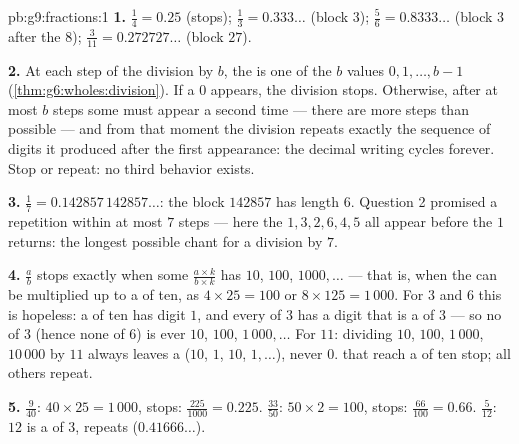 \begin{solution}{pb:g9:fractions:1}
\textbf{1.} $\frac14 = 0.25$ (stops); $\frac13 = 0.333\ldots$
(block $3$); $\frac56 = 0.8333\ldots$ (block $3$ after the
$8$); $\frac{3}{11} = 0.272727\ldots$ (block $27$).

\textbf{2.} At each step of the division by $b$, the 
is one of the $b$ values $0, 1, \dots, b - 1$
(\cref{thm:g6:wholes:division}). If a  $0$ appears, the
division stops. Otherwise, after at most $b$ steps some
 must appear a second time --- there are more steps
than possible  --- and from that moment the division
repeats exactly the sequence of digits it produced after the
first appearance: the decimal writing cycles forever. Stop or
repeat: no third behavior exists.

\textbf{3.} $\frac17 = 0.142857\,142857\ldots$: the block
$142857$ has length $6$. Question 2 promised a repetition within
at most $7$ steps --- here the 
$1, 3, 2, 6, 4, 5$ all appear before the $1$ returns: the
longest possible chant for a division by $7$.

\textbf{4.} $\frac ab$ stops exactly when some
$\frac{a \times k}{b \times k}$ has  $10$, $100$,
$1000, \dots$ --- that is, when the  can be
multiplied up to a  of ten, as $4 \times 25 = 100$ or
$8 \times 125 = 1\,000$. For $3$ and $6$ this is hopeless: a
 of ten has digit  $1$, and every  of $3$ has a
digit  that is a  of $3$ --- so no  of $3$
(hence none of $6$) is ever $10$, $100$, $1\,000, \dots$ For
$11$: dividing $10$, $100$, $1\,000$, $10\,000$ by $11$ always
leaves a  ($10$, $1$, $10$, $1, \dots$), never $0$.
 that reach a  of ten stop; all others repeat.

\textbf{5.} $\frac{9}{40}$: $40 \times 25 = 1\,000$, stops:
$\frac{225}{1000} = 0.225$. $\frac{33}{50}$:
$50 \times 2 = 100$, stops: $\frac{66}{100} = 0.66$.
$\frac{5}{12}$: $12$ is a  of $3$, repeats
($0.41666\ldots$).


\end{solution}
